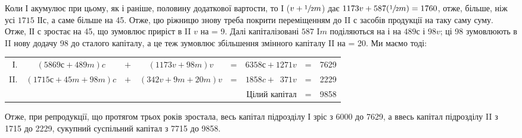 Коли І акумулює при цьому, як і раніше, половину додаткової вартости,
то І ($v + \sfrac{1}{2} m$) дає $1173 v + 587 (\sfrac{1}{2} m) = 1760$, отже, більше,
ніж усі $1715 \text{ ІІ} с$, а саме більше на 45. Отже, цю ріжницю знову треба
покрити переміщенням до II $с$ засобів продукції на таку саму суму. Отже,
ІІ $с$ зростає на 45, що зумовлює приріст в II $v$ на  = 9. Далі капіталізовані
$587 \text{ I} m$ поділяються на  і  на $489 с$ і $98 v$; ці 98 зумовлюють
в II нову додачу 98 до сталого капіталу, а це теж зумовлює
збільшення змінного капіталу II на  = 20. Ми маємо тоді:

\begin{table}[h]
  \begin{center}
  \begin{tabular}{r@{ } c@{ } r@{ } c@{ } r@{ } r@{ } r@{ } r@{ }}
І. & $(5869 с + 489 m) c$ & $+$ & $(1173 v + 98 m) v$ & = & $6358 с + 1271 v$ & = & 7629\\
II. & $(1715 с + 45 m + 98 m) c$ & $+$ & $(342 v + 9 m + 20 m) v$ & = & $1858 c + \phantom{0}371 v$ & = & 2229\\
    \cmidrule{6-8}
    &                            &   &                          &   &    Цілий капітал & = & 9858
  \end{tabular}
  \end{center}
\end{table}

Отже, при репродукції, що протягом трьох років зростала,
весь капітал підрозділу І зріс з 6000 до 7629, а ввесь капітал підрозділу
II з 1715 до 2229, сукупний суспільний капітал з 7715 до 9858.
